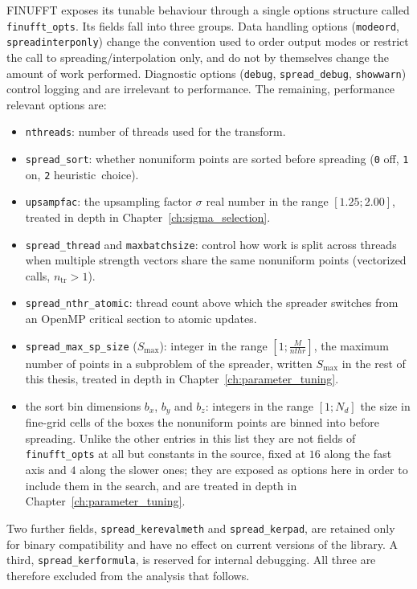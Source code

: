 FINUFFT exposes its tunable behaviour through a single options structure called \texttt{finufft\_opts}. Its fields fall into three groups. Data handling options (\texttt{modeord}, \texttt{spreadinterponly}) change the convention used to order output modes or restrict the call to spreading/interpolation only, and do not by themselves change the amount of work performed. Diagnostic options (\texttt{debug}, \texttt{spread\_debug}, \texttt{showwarn}) control logging and are irrelevant to performance. The remaining, performance relevant options are:
\begin{itemize}
    \item \texttt{nthreads}: number of threads used for the transform.
    \item \texttt{spread\_sort}: whether nonuniform points are sorted before spreading (\texttt{0} off, \texttt{1} on, \texttt{2} heuristic~choice).
    \item \texttt{upsampfac}: the upsampling factor $\sigma$ real number in the range $[1.25;2.00]$, treated in depth in Chapter~\ref{ch:sigma_selection}.
    \item \texttt{spread\_thread} and \texttt{maxbatchsize}: control how work is split across threads when multiple strength vectors share the same nonuniform points (vectorized calls, $n_{\mathrm{tr}} > 1$).
    \item \texttt{spread\_nthr\_atomic}: thread count above which the spreader switches from an OpenMP critical section to atomic updates.
    \item \texttt{spread\_max\_sp\_size} ($S_{\max}$): integer in the range $[1;\frac{M}{nthr}]$, the maximum number of points in a subproblem of the spreader, written $S_{\max}$ in the rest of this thesis, treated in depth in Chapter~\ref{ch:parameter_tuning}.
    \item the sort bin dimensions $b_x$, $b_y$ and $b_z$: integers in the range $[1;N_d]$ the size in fine-grid cells of the boxes the nonuniform points are binned into before spreading. Unlike the other entries in this list they are not fields of \texttt{finufft\_opts} at all but constants in the source, fixed at $16$ along the fast axis and $4$ along the slower ones; they are exposed as options here in order to include them in the search, and are treated in depth in Chapter~\ref{ch:parameter_tuning}.
\end{itemize}
Two further fields, \texttt{spread\_kerevalmeth} and \texttt{spread\_kerpad}, are retained only for binary compatibility and have no effect on current versions of the library. A third, \texttt{spread\_kerformula}, is reserved for internal debugging. All three are therefore excluded from the analysis that follows.
